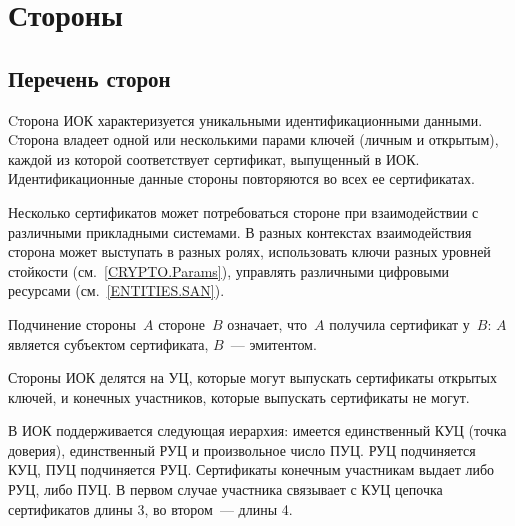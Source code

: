 \chapter{Стороны}\label{ENTITIES}

\section{Перечень сторон}

Cторона ИОК характеризуется уникальными идентификационными данными.
%
Cторона владеет одной или несколькими парами ключей (личным и открытым),
каждой из которой соответствует сертификат, выпущенный в ИОК. 
%
Идентификационные данные стороны повторяются во всех ее сертификатах.
%

Несколько сертификатов может потребоваться стороне при взаимодействии 
с различными прикладными системами. В разных контекстах взаимодействия
сторона может выступать в разных ролях, 
использовать ключи разных уровней стойкости (см.~\ref{CRYPTO.Params}), 
управлять различными цифровыми ресурсами (см.~\ref{ENTITIES.SAN}). 
%

Подчинение стороны~$A$ стороне~$B$ означает, что~$A$ получила сертификат 
у~$B$: $A$ является субъектом сертификата, $B$~--- эмитентом.
%

Стороны ИОК делятся на УЦ, которые могут выпускать сертификаты открытых ключей, 
и конечных участников, которые выпускать сертификаты не могут.

В ИОК поддерживается следующая иерархия: 
имеется единственный КУЦ (точка доверия), единственный РУЦ и
произвольное число ПУЦ. РУЦ подчиняется КУЦ, ПУЦ подчиняется РУЦ. 
Сертификаты конечным участникам выдает либо РУЦ, либо ПУЦ.
В первом случае участника связывает с КУЦ цепочка сертификатов длины 3,
во втором~--- длины 4.

